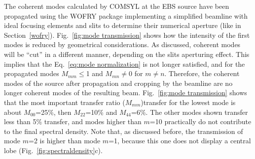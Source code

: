 \documentclass{iucr}              %
\begin{document}
The coherent modes calculated by COMSYL at the EBS source have been propagated using the WOFRY package implementing a simplified beamline with ideal focusing elements and slits to determine their numerical aperture (like in Section~\ref{wofry}). Fig.~\ref{fig:mode transmission} shows how the intensity of the first modes is reduced by geometrical considerations. 
As discussed, coherent modes will be ``cut'' in a different manner, depending on the slits aperturing effect.
This implies that the Eq.~\ref{eq:mode normalization} is not longer satisfied, and for the propagated modes $M_{mm}\le$1 and $M_{mn}\ne$0 for $m\ne n$. Therefore, the coherent modes of the source after propagation and cropping by the beamline are no longer coherent modes of the resulting beam. Fig.~\ref{fig:mode transmission} shows that the most important transfer ratio ($M_{mm}$)transfer for the lowest mode is about $M_{00}$=25\%, then $M_{22}$=10\% and $M_{44}$=6\%. The other modes shown transfer less than 5\% transfer, and modes higher than $m$=10 practically do not contribute to the final spectral density. Note that, as discussed before, the transmission of mode $m$=2 is higher than mode $m$=1, because this one does not display a central lobe (Fig.~\ref{fig:spectraldensity}c).  

\end{document}
